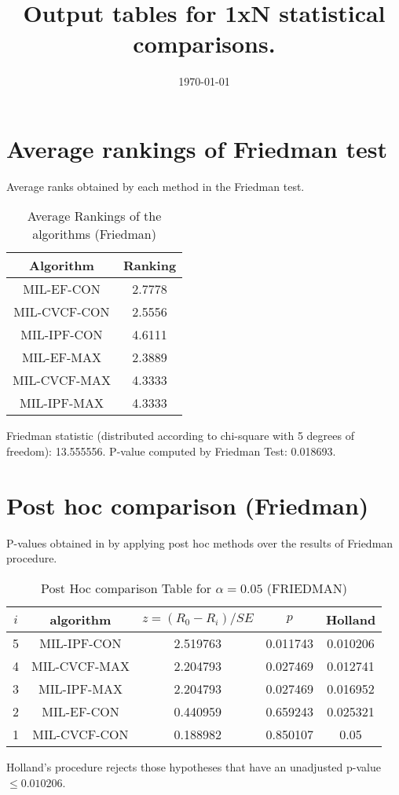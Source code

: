 \documentclass[a4paper,10pt]{article}
\title{Output tables for 1xN statistical comparisons.}
\author{}
\date{\today}
\begin{document}
\begin{landscape}
\pagestyle{empty}
\maketitle
\thispagestyle{empty}

\section{Average rankings of Friedman test}


Average ranks obtained by each method in the Friedman test.

\begin{table}[!htp]
\centering
\begin{tabular}{|c|c|}\hline
Algorithm&Ranking\\\hline
MIL-EF-CON&2.7778\\MIL-CVCF-CON&2.5556\\MIL-IPF-CON&4.6111\\MIL-EF-MAX&2.3889\\MIL-CVCF-MAX&4.3333\\MIL-IPF-MAX&4.3333\\\hline\end{tabular}
\caption{Average Rankings of the algorithms (Friedman)}
\end{table}

Friedman statistic (distributed according to chi-square with 5 degrees of freedom): 13.555556. \newline P-value computed by Friedman Test: 0.018693.\newline


\newpage

\section{Post hoc comparison (Friedman)}


P-values obtained in by applying post hoc methods over the results of Friedman procedure.

\begin{table}[!htp]
\centering\footnotesize
\begin{tabular}{ccccc}
$i$&algorithm&$z=(R_0 - R_i)/SE$&$p$&Holland\\
\hline5&MIL-IPF-CON&2.519763&0.011743&0.010206\\4&MIL-CVCF-MAX&2.204793&0.027469&0.012741\\3&MIL-IPF-MAX&2.204793&0.027469&0.016952\\2&MIL-EF-CON&0.440959&0.659243&0.025321\\1&MIL-CVCF-CON&0.188982&0.850107&0.05\\\hline
\end{tabular}
\caption{Post Hoc comparison Table for $\alpha=0.05$ (FRIEDMAN)}
\end{table}Holland's procedure rejects those hypotheses that have an unadjusted p-value $\le0.010206$.



\end{landscape}
\end{document}
